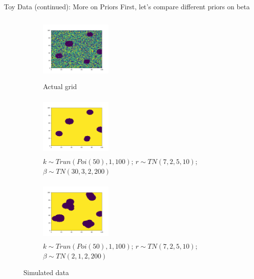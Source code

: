 \documentclass[10pt,mathserif]{beamer}
\begin{document}
\begin{frame}{Toy Data (continued): More on Priors}
First, let's compare different priors on beta
\begin{figure}[t!]
    \centering
    \begin{subfigure}[t]{0.3\textwidth}
        \centering
        \includegraphics[height=1.3in, width=1.4in]{../sim_toydata2D_mu8/BDC_gridactual}
        \caption{Actual grid}
    \end{subfigure}%
    \begin{subfigure}[t]{0.3\textwidth}
        \centering
        \includegraphics[height=1.2in, width=1.4in]{../sim_toydata2D_mu8/BDC_grid2_strongsig}
        \caption{ $k \sim Trun(Poi(50), 1, 100)$; $r \sim TN(7, 2, 5, 10)$; $\beta \sim TN(30, 3, 2, 200)$}
    \end{subfigure}%
        \begin{subfigure}[t]{0.3\textwidth}
        \centering
        \includegraphics[height=1.2in, width=1.4in]{../sim_toydata2D_mu8/BDC_grid3_weaksig}
        \caption{ $k \sim Trun(Poi(50), 1, 100)$; $r \sim TN(7, 2, 5, 10)$; \textbf{$\beta \sim TN(2, 1, 2, 200)$}}
    \end{subfigure}
    \caption{Simulated data}
\end{figure}
\end{frame}
\end{document}
